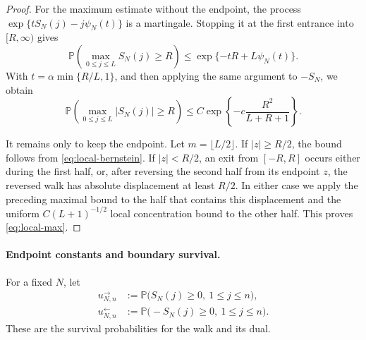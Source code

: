 \documentclass[11pt]{article}
\theoremstyle{plain}
\theoremstyle{definition}
\theoremstyle{remark}
\newcommand{\Pp}{\mathbb P}
\begin{document}
\begin{proof}
For the maximum estimate without the endpoint, the process
\(\exp\{tS_N(j)-j\psi_N(t)\}\) is a martingale. Stopping it at the first
entrance into \([R,\infty)\) gives
\[
 \Pp\left(\max_{0\le j\le L}S_N(j)\ge R\right)
 \le \exp\{-tR+L\psi_N(t)\}.
\]
With \(t=\alpha\min\{R/L,1\}\), and then applying the same argument to
\(-S_N\), we obtain
\[
 \Pp\left(\max_{0\le j\le L}|S_N(j)|\ge R\right)
 \le C\exp\left\{-c\frac{R^2}{L+R+1}\right\}.
\]

It remains only to keep the endpoint. Let \(m=\lfloor L/2\rfloor\). If
\(|z|\ge R/2\), the bound follows from \eqref{eq:local-bernstein}. If
\(|z|<R/2\), an exit from \([-R,R]\) occurs either during the first half,
or, after reversing the second half from its endpoint \(z\), the reversed
walk has absolute displacement at least \(R/2\). In either case we apply
the preceding maximal bound to the half that contains this displacement
and the uniform \(C(L+1)^{-1/2}\) local concentration bound to the other
half. This proves \eqref{eq:local-max}.
\end{proof}

\paragraph{Endpoint constants and boundary survival.}

For a fixed \(N\), let
\begin{align*}
 u_{N,n}^{\rightarrow}
 &:=\Pp\bigl(S_N(j)\ge0,\ 1\le j\le n\bigr),\\
 u_{N,n}^{\leftarrow}
 &:=\Pp\bigl(-S_N(j)\ge0,\ 1\le j\le n\bigr).
\end{align*}
These are the survival probabilities for the walk and its dual. 
\end{document}
